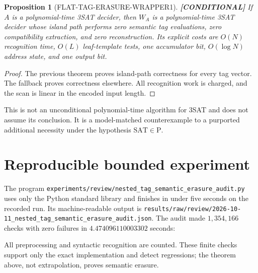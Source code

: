 \documentclass[11pt]{article}
\newtheorem{proposition}{Proposition}
\newcommand{\SAT}{\mathrm{SAT}}
\newcommand{\status}[1]{\textbf{[#1]}}
\begin{document}
\begin{proposition}[FLAT-TAG-ERASURE-WRAPPER1]
\status{CONDITIONAL} If $A$ is a polynomial-time 3SAT decider, then $W_A$
is a polynomial-time 3SAT decider whose island path performs zero semantic
tag evaluations, zero compatibility extraction, and zero reconstruction.
Its explicit costs are $O(N)$ recognition time, $O(L)$ leaf-template tests,
one accumulator bit, $O(\log N)$ address state, and one output bit.
\end{proposition}
\begin{proof}
The previous theorem proves island-path correctness for every tag vector.
The fallback proves correctness elsewhere.  All recognition work is
charged, and the scan is linear in the encoded input length.
\end{proof}

This is not an unconditional polynomial-time algorithm for 3SAT and does
not assume its conclusion.  It is a model-matched counterexample to a
purported additional necessity under the hypothesis $\SAT\in\mathrm P$.

\section{Reproducible bounded experiment}

The program
\texttt{experiments/review/nested\_tag\_semantic\_erasure\_audit.py}
uses only the Python standard library and finishes in under five seconds
on the recorded run.  Its machine-readable output is
\texttt{results/raw/review/2026-10-11\_nested\_tag\_semantic\_erasure\_audit.json}.
The audit made $1{,}354{,}166$ checks with zero failures in
$4.474096110003302$ seconds:
All preprocessing and syntactic recognition are counted.  These finite
checks support only the exact implementation and detect regressions; the
theorem above, not extrapolation, proves semantic erasure.
\end{document}

